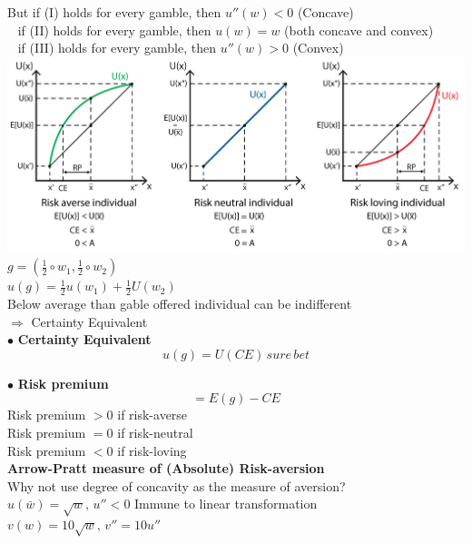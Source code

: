 \documentclass[letterpaper,13pt,single,pdftex]{scrartcl}
\begin{document}
But if (I) holds for every gamble, then $u''(w) <0$ (Concave)\\
$\,\,\,  $  if (II) holds for every gamble, then $u(w) =w $ (both concave and convex)\\
$\,\,\,   $ if (III) holds for every gamble, then $u''(w) >0 $ (Convex)\\
\newpage
\includegraphics[scale = 0.25 ]{Risk-aversion.jpg}\\
$g = (\frac{1}{2} \circ w_1, \frac{1}{2} \circ w_2)$\\
$u(g) = \frac{1}{2} u(w_1) + \frac{1}{2} U(w_2)$\\
Below average than gable offered individual can be indifferent\\
$\Rightarrow$ Certainty Equivalent\\

$\bullet$ \textbf{Certainty Equivalent}\\
\[u(g) = U(CE) \,sure\, bet\]

$\bullet$ \textbf{Risk premium} 
\[ = E(g) - CE\]
Risk premium $>0$ if risk-averse\\
Risk premium $=0$ if risk-neutral\\
Risk premium $<0$ if risk-loving\\

\textbf{Arrow-Pratt measure of (Absolute) Risk-aversion}\\
Why not use degree of concavity as the measure of aversion? \\
$ u(\bar w) = \sqrt{w}, \, u''<0$ Immune to linear transformation\\
$ v(w) = 10\sqrt{w}, \, v'' = 10 u''$\\
\end{document}
